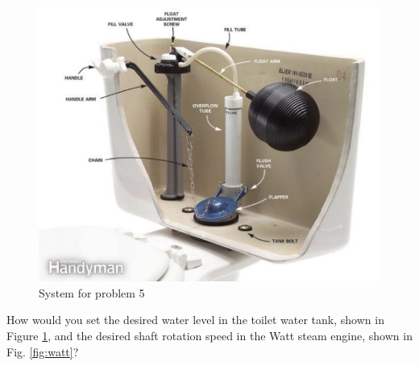 \documentclass[11pt]{article}
\begin{document}
\begin{figure}[h] 
    \centering
    \includegraphics[width=0.55 \linewidth]{fig16.png}
    \caption{System for problem 5}
    \label{fig:16}
\end{figure}

\soln





How would you set the desired water level in the toilet water tank, shown in
Figure \ref{fig:16}, and the desired shaft rotation speed in the Watt steam engine, shown in Fig. \ref{fig:watt}?
\end{document}
